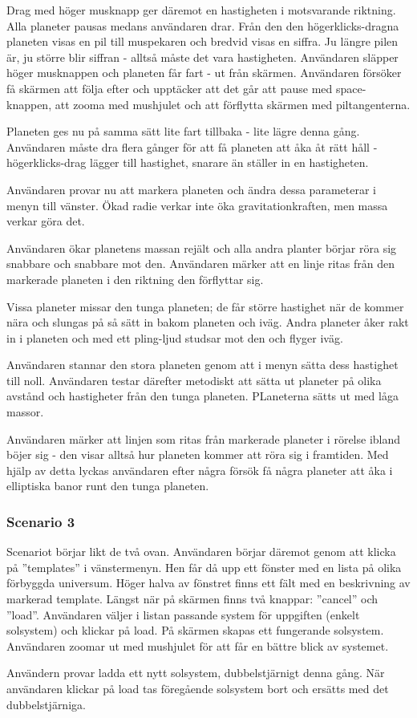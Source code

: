 Drag med höger musknapp ger däremot en hastigheten i motsvarande riktning.
Alla planeter pausas medans användaren drar.
Från den den högerklicks-dragna planeten visas en pil till muspekaren
och bredvid visas en siffra.
Ju längre pilen är, ju större blir siffran - alltså måste det vara hastigheten.
Användaren släpper höger musknappen och planeten får fart - ut från skärmen.
Användaren försöker få skärmen att följa efter och
upptäcker att det går att pause med space-knappen,
att zooma med mushjulet och att förflytta skärmen med piltangenterna.

Planeten ges nu på samma sätt lite fart tillbaka - lite lägre denna gång.
Användaren måste dra flera gånger för att få planeten att
åka åt rätt håll - högerklicks-drag lägger till hastighet,
snarare än ställer in en hastigheten.

Användaren provar nu att markera planeten och 
ändra dessa parameterar i menyn till vänster.
Ökad radie verkar inte öka gravitationkraften,
men massa verkar göra det.

Användaren ökar planetens massan rejält och alla andra planter börjar
röra sig snabbare och snabbare mot den.
Användaren märker att en linje ritas från den markerade planeten
i den riktning den förflyttar sig.

Vissa planeter missar den tunga planeten; de får större hastighet när
de kommer nära och slungas på så sätt in bakom planeten och iväg.
Andra planeter åker rakt in i planeten och med ett pling-ljud
studsar mot den och flyger iväg.

Användaren stannar den stora planeten genom att i menyn
sätta dess hastighet till noll.
Användaren testar därefter metodiskt att sätta ut planeter på olika avstånd
och hastigheter från den tunga planeten.
PLaneterna sätts ut med låga massor.

Användaren märker att linjen som ritas från markerade planeter i rörelse
ibland böjer sig - den visar alltså hur planeten kommer att röra
sig i framtiden.
Med hjälp av detta lyckas användaren efter några försök
få några planeter att åka i elliptiska banor runt den tunga planeten.


\subsubsection*{Scenario 3}

Scenariot börjar likt de två ovan.
Användaren börjar däremot genom att klicka på ''templates'' i vänstermenyn.
Hen får då upp ett fönster med en lista på olika förbyggda universum.
Höger halva av fönstret finns ett fält med en beskrivning av markerad
template.
Längst när på skärmen finns två knappar: ''cancel'' och ''load''.
Användaren väljer i listan passande system för uppgiften
(enkelt solsystem) och klickar på load.
På skärmen skapas ett fungerande solsystem.
Användaren zoomar ut med mushjulet för att får en bättre blick av systemet.

Användern provar ladda ett nytt solsystem, dubbelstjärnigt denna gång.
När användaren klickar på load tas föregående solsystem bort och
ersätts med det dubbelstjärniga.
